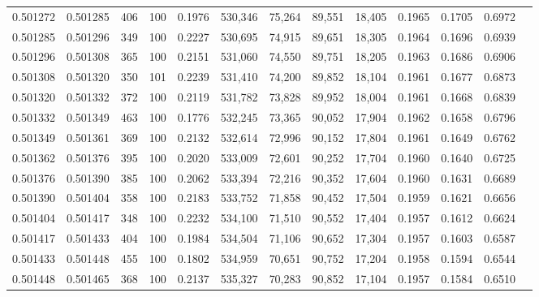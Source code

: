 \begin{tabular}{rrrrrrrrrrrrr}
0.501272 & 0.501285 &   406 & 100 &                                     0.1976 & 530,346 &  75,264 &  89,551 &  18,405 & 0.1965 & 0.1705 & 0.6972 \\
0.501285 & 0.501296 &   349 & 100 &                                     0.2227 & 530,695 &  74,915 &  89,651 &  18,305 & 0.1964 & 0.1696 & 0.6939 \\
0.501296 & 0.501308 &   365 & 100 &                                     0.2151 & 531,060 &  74,550 &  89,751 &  18,205 & 0.1963 & 0.1686 & 0.6906 \\
0.501308 & 0.501320 &   350 & 101 &                                     0.2239 & 531,410 &  74,200 &  89,852 &  18,104 & 0.1961 & 0.1677 & 0.6873 \\
0.501320 & 0.501332 &   372 & 100 &                                     0.2119 & 531,782 &  73,828 &  89,952 &  18,004 & 0.1961 & 0.1668 & 0.6839 \\
0.501332 & 0.501349 &   463 & 100 &                                     0.1776 & 532,245 &  73,365 &  90,052 &  17,904 & 0.1962 & 0.1658 & 0.6796 \\
0.501349 & 0.501361 &   369 & 100 &                                     0.2132 & 532,614 &  72,996 &  90,152 &  17,804 & 0.1961 & 0.1649 & 0.6762 \\
0.501362 & 0.501376 &   395 & 100 &                                     0.2020 & 533,009 &  72,601 &  90,252 &  17,704 & 0.1960 & 0.1640 & 0.6725 \\
0.501376 & 0.501390 &   385 & 100 &                                     0.2062 & 533,394 &  72,216 &  90,352 &  17,604 & 0.1960 & 0.1631 & 0.6689 \\
0.501390 & 0.501404 &   358 & 100 &                                     0.2183 & 533,752 &  71,858 &  90,452 &  17,504 & 0.1959 & 0.1621 & 0.6656 \\
0.501404 & 0.501417 &   348 & 100 &                                     0.2232 & 534,100 &  71,510 &  90,552 &  17,404 & 0.1957 & 0.1612 & 0.6624 \\
0.501417 & 0.501433 &   404 & 100 &                                     0.1984 & 534,504 &  71,106 &  90,652 &  17,304 & 0.1957 & 0.1603 & 0.6587 \\
0.501433 & 0.501448 &   455 & 100 &                                     0.1802 & 534,959 &  70,651 &  90,752 &  17,204 & 0.1958 & 0.1594 & 0.6544 \\
0.501448 & 0.501465 &   368 & 100 &                                     0.2137 & 535,327 &  70,283 &  90,852 &  17,104 & 0.1957 & 0.1584 & 0.6510 \\

\end{tabular}
